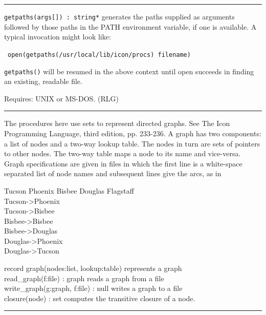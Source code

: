 \vspace{0.25cm}\hrule{}

\texttt{getpaths(args[]) : string*} generates the paths supplied as
arguments followed by those paths in the PATH environment variable, if one is available. A typical
invocation might look like:

\ \texttt{open(getpaths({\textquotedbl}/usr/local/lib/icon/procs{\textquotedbl})
{\textbar}{\textbar} filename)}

\texttt{getpaths()} will be resumed in the above context until open
succeeds in finding an existing, readable file.

Requires: UNIX or MS-DOS. (RLG)

\vspace{0.25cm}\hrule{}

The procedures here use sets to represent directed graphs.
See {\textquotedbl}The Icon Programming Language{\textquotedbl}, third
edition, pp. 233-236. A graph has two components: a list of nodes and a
two-way lookup table. The nodes in turn are sets of
pointers to other nodes. The two-way table maps a node
to its name and vice-versa. Graph specifications are given in files in
which the first line is a white-space separated list of node names and
subsequent lines give the arcs, as in

Tucson Phoenix Bisbee Douglas Flagstaff\\
Tucson-{\textgreater}Phoenix\\
Tucson-{\textgreater}Bisbee\\
Bisbee-{\textgreater}Bisbee\\
Bisbee-{\textgreater}Douglas\\
Douglas-{\textgreater}Phoenix\\
Douglas-{\textgreater}Tucson

record graph(nodes:list, lookup:table) represents a graph\\
read\_graph(f:file) : graph reads a graph from a file\\
write\_graph(g:graph, f:file) : null writes a graph to a file\\
closure(node) : set computes the transitive closure of a node.
\ \ \ \ \ \ 

\vspace{0.25cm}\hrule{}

